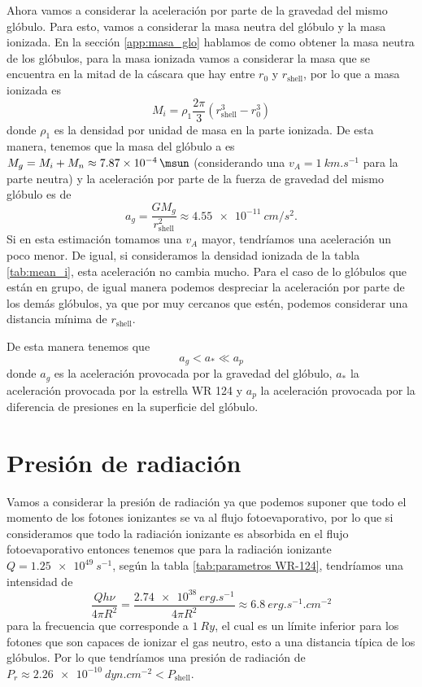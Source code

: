 \documentclass{book}
\begin{document}
Ahora vamos a considerar la aceleración por parte de la gravedad del mismo glóbulo. Para esto, vamos a considerar la masa neutra del glóbulo y la masa ionizada. En la sección \ref{app:masa_glo} hablamos de como obtener la masa neutra de los glóbulos, para la masa ionizada vamos a considerar la masa que se encuentra en la mitad de la cáscara que hay entre $r_0$ y $r_\mathrm{shell}$, por lo que a masa ionizada es
\begin{equation}
    M_i = \rho_1 \frac{2\pi}{3}(r_\mathrm{shell}^3-r_0^3)
\end{equation}
donde $\rho_1$ es la densidad por unidad de masa en la parte ionizada. De esta manera, tenemos que la masa del glóbulo a es $M_g = M_i + M_n \approx \SI{7.87e-4}{\msun}$ (considerando una $v_A=\SI{1}{km.s^{-1}}$ para la parte neutra) y la aceleración por parte de la fuerza de gravedad del mismo glóbulo es de
\begin{equation}
a_g=\frac{G M_g}{r_\mathrm{shell}^2}\approx \SI{4.55e-11}{cm/s^2}.
\end{equation}
Si en esta estimación tomamos una $v_A$ mayor, tendríamos una aceleración un poco menor. De igual, si consideramos la densidad ionizada de la tabla \ref{tab:mean_i}, esta aceleración no cambia mucho. Para el caso de lo glóbulos que están en grupo, de igual manera podemos despreciar la aceleración por parte de los demás glóbulos, ya que por muy cercanos que estén, podemos considerar una distancia mínima de $r_\mathrm{shell}$. 

De esta manera tenemos que
\begin{equation}
a_g<a_*\ll a_p
\end{equation}
donde $a_g$ es la aceleración provocada por la gravedad del glóbulo, $a_*$ la aceleración provocada por la estrella WR 124 y $a_p$ la aceleración provocada por la diferencia de presiones en la superficie del glóbulo.

\section{Presión de radiación}

Vamos a considerar la presión de radiación ya que podemos suponer que todo el momento de los fotones ionizantes se va al flujo fotoevaporativo, por lo que si consideramos que todo la radiación ionizante es absorbida en el flujo fotoevaporativo entonces tenemos que para la radiación ionizante $Q = \SI{1.25e49}{s^{-1}}$, según la tabla \ref{tab:parametros WR-124}, tendríamos una intensidad de 
\begin{equation}
\frac{Q h\nu}{4\pi R^2} = \frac{\SI{2.74e38}{erg.s^{-1}}}{4\pi R^2} \approx \SI{6.8}{erg.s^{-1}.cm^{-2}}
\end{equation}
para la frecuencia que corresponde a  $\SI{1}{Ry}$, el cual es un límite inferior para los fotones que son capaces de ionizar el gas neutro, esto a una distancia típica de los glóbulos. Por lo que tendríamos una presión de radiación de $P_r\approx \SI{2.26e-10}{dyn.cm^{-2}} < P_\mathrm{shell}$. 
\end{document}
